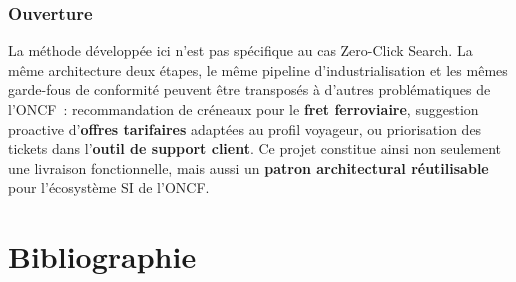 \documentclass[12pt, a4paper]{report}
\begin{document}
\subsection*{Ouverture}

La méthode développée ici n'est pas spécifique au cas Zero-Click Search.
La même architecture deux étapes, le même pipeline d'industrialisation et
les mêmes garde-fous de conformité peuvent être transposés à d'autres
problématiques de l'ONCF~: recommandation de créneaux pour le \textbf{fret
ferroviaire}, suggestion proactive d'\textbf{offres tarifaires} adaptées au
profil voyageur, ou priorisation des tickets dans l'\textbf{outil de
support client}. Ce projet constitue ainsi non seulement une livraison
fonctionnelle, mais aussi un \textbf{patron architectural réutilisable}
pour l'écosystème SI de l'ONCF.

\newpage
\chapter*{Bibliographie}
\end{document}
